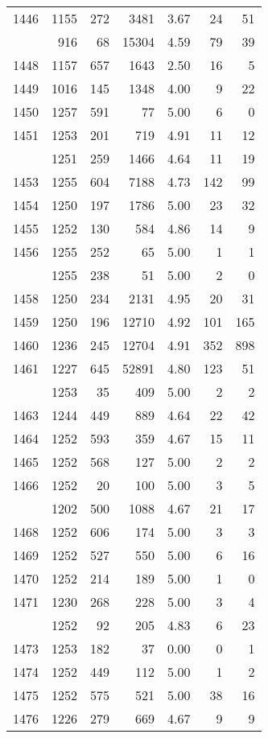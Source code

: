 \documentclass[
]{article}
\begin{document}
\begin{table}
\begin{tabular}[t]{lrrrrrr}
1446 & 1155 & 272 & 3481 & 3.67 & 24 & 51\\
\addlinespace
1447 & 916 & 68 & 15304 & 4.59 & 79 & 39\\
1448 & 1157 & 657 & 1643 & 2.50 & 16 & 5\\
1449 & 1016 & 145 & 1348 & 4.00 & 9 & 22\\
1450 & 1257 & 591 & 77 & 5.00 & 6 & 0\\
1451 & 1253 & 201 & 719 & 4.91 & 11 & 12\\
\addlinespace
1452 & 1251 & 259 & 1466 & 4.64 & 11 & 19\\
1453 & 1255 & 604 & 7188 & 4.73 & 142 & 99\\
1454 & 1250 & 197 & 1786 & 5.00 & 23 & 32\\
1455 & 1252 & 130 & 584 & 4.86 & 14 & 9\\
1456 & 1255 & 252 & 65 & 5.00 & 1 & 1\\
\addlinespace
1457 & 1255 & 238 & 51 & 5.00 & 2 & 0\\
1458 & 1250 & 234 & 2131 & 4.95 & 20 & 31\\
1459 & 1250 & 196 & 12710 & 4.92 & 101 & 165\\
1460 & 1236 & 245 & 12704 & 4.91 & 352 & 898\\
1461 & 1227 & 645 & 52891 & 4.80 & 123 & 51\\
\addlinespace
1462 & 1253 & 35 & 409 & 5.00 & 2 & 2\\
1463 & 1244 & 449 & 889 & 4.64 & 22 & 42\\
1464 & 1252 & 593 & 359 & 4.67 & 15 & 11\\
1465 & 1252 & 568 & 127 & 5.00 & 2 & 2\\
1466 & 1252 & 20 & 100 & 5.00 & 3 & 5\\
\addlinespace
1467 & 1202 & 500 & 1088 & 4.67 & 21 & 17\\
1468 & 1252 & 606 & 174 & 5.00 & 3 & 3\\
1469 & 1252 & 527 & 550 & 5.00 & 6 & 16\\
1470 & 1252 & 214 & 189 & 5.00 & 1 & 0\\
1471 & 1230 & 268 & 228 & 5.00 & 3 & 4\\
\addlinespace
1472 & 1252 & 92 & 205 & 4.83 & 6 & 23\\
1473 & 1253 & 182 & 37 & 0.00 & 0 & 1\\
1474 & 1252 & 449 & 112 & 5.00 & 1 & 2\\
1475 & 1252 & 575 & 521 & 5.00 & 38 & 16\\
1476 & 1226 & 279 & 669 & 4.67 & 9 & 9\\

\end{tabular}
\end{table}
\end{document}
